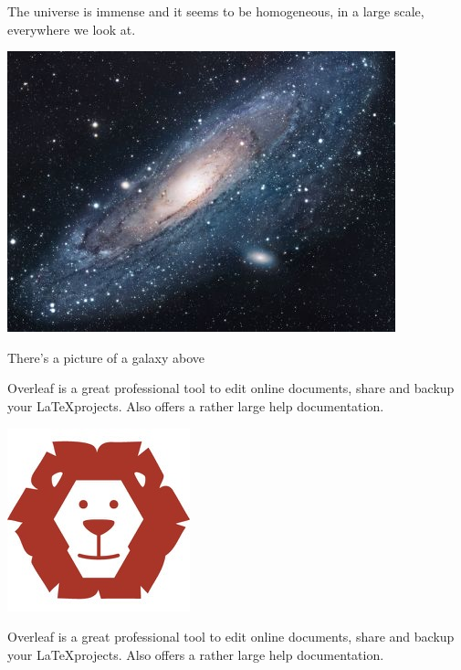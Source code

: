 \documentclass{article}
\begin{document}
The universe is immense and it seems to be homogeneous, in a large scale, everywhere we look at.

\includegraphics{universe}

There's a picture of a galaxy above

\vspace{1.5cm}

Overleaf is a great professional tool to edit online documents, 
share and backup your \LaTeX projects. Also offers a 
rather large help documentation.

\includegraphics[scale=1.5]{lion-logo}

\newpage

Overleaf is a great professional tool to edit online documents, 
share and backup your \LaTeX projects. Also offers a 
rather large help documentation.
\end{document}
